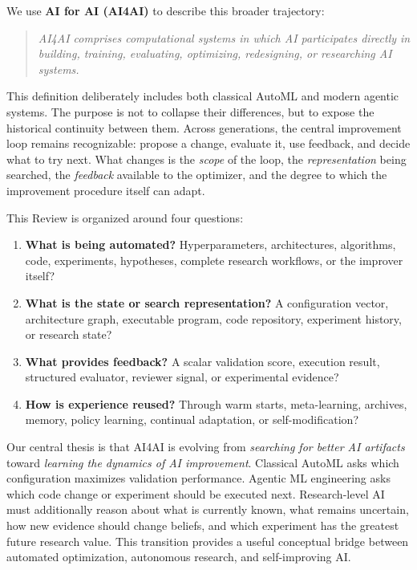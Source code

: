 \documentclass[journal]{IEEEtran}
\begin{document}
We use \textbf{AI for AI (AI4AI)} to describe this broader trajectory:

\begin{quote}
\emph{AI4AI comprises computational systems in which AI participates directly in building, training, evaluating, optimizing, redesigning, or researching AI systems.}
\end{quote}

This definition deliberately includes both classical AutoML and modern agentic systems. The purpose is not to collapse their differences, but to expose the historical continuity between them. Across generations, the central improvement loop remains recognizable: propose a change, evaluate it, use feedback, and decide what to try next. What changes is the \emph{scope} of the loop, the \emph{representation} being searched, the \emph{feedback} available to the optimizer, and the degree to which the improvement procedure itself can adapt.

This Review is organized around four questions:
\begin{enumerate}[leftmargin=*]
    \item \textbf{What is being automated?} Hyperparameters, architectures, algorithms, code, experiments, hypotheses, complete research workflows, or the improver itself?
    \item \textbf{What is the state or search representation?} A configuration vector, architecture graph, executable program, code repository, experiment history, or research state?
    \item \textbf{What provides feedback?} A scalar validation score, execution result, structured evaluator, reviewer signal, or experimental evidence?
    \item \textbf{How is experience reused?} Through warm starts, meta-learning, archives, memory, policy learning, continual adaptation, or self-modification?
\end{enumerate}

Our central thesis is that AI4AI is evolving from \emph{searching for better AI artifacts} toward \emph{learning the dynamics of AI improvement}. Classical AutoML asks which configuration maximizes validation performance. Agentic ML engineering asks which code change or experiment should be executed next. Research-level AI must additionally reason about what is currently known, what remains uncertain, how new evidence should change beliefs, and which experiment has the greatest future research value. This transition provides a useful conceptual bridge between automated optimization, autonomous research, and self-improving AI.
\end{document}
